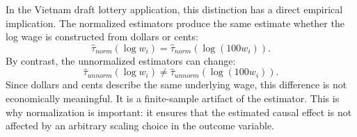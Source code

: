 \documentclass[11pt,a4paper]{article}
\begin{document}
In the Vietnam draft lottery application, this distinction has a direct
empirical implication. The normalized estimators produce the same estimate
whether the log wage is constructed from dollars or cents:
\[
    \hat{\tau}_{norm}(\log w_i)
    =
    \hat{\tau}_{norm}(\log(100w_i)).
\]
By contrast, the unnormalized estimators can change:
\[
    \hat{\tau}_{unnorm}(\log w_i)
    \neq
    \hat{\tau}_{unnorm}(\log(100w_i)).
\]
Since dollars and cents describe the same underlying wage, this difference is
not economically meaningful. It is a finite-sample artifact of the estimator.
This is why normalization is important: it ensures that the estimated causal
effect is not affected by an arbitrary scaling choice in the outcome variable.
\end{document}
